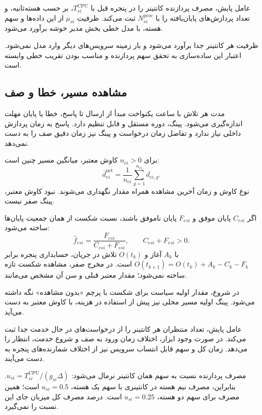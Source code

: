 عامل پایش، مصرف پردازنده کانتینر را در پنجره قبل با $T^{\mathrm{CPU}}_{si}$، بر حسب هسته‌ثانیه، و تعداد پردازش‌های پایان‌یافته را با $N^{\mathrm{proc}}_{si}$ ثبت می‌کند. ظرفیت $\mu_{si}$ از این داده‌ها و سهم هسته، با مدل خطی بخش مدیر خوشه برآورد می‌شود.

ظرفیت هر کانتینر جدا برآورد می‌شود و بار زمینه سرویس‌های دیگر وارد مدل نمی‌شود. اعتبار این ساده‌سازی به تحقق سهم پردازنده و مناسب بودن تقریب خطی وابسته است.

\subsection{مشاهده مسیر، خطا و صف}

مدت هر تلاش با ساعت یکنواخت مبدأ از ارسال تا پاسخ، خطا یا پایان مهلت اندازه‌گیری می‌شود. پینگ، دوره مستقل و قابل تنظیم دارد. پاسخ  به زمان پردازش داخلی نیاز ندارد و تفاضل زمان درخواست و پینگ نیز زمان دقیق صف را به دست نمی‌دهد.

برای $n_{ei}>0$ کاوش معتبر، میانگین مسیر چنین است:
\begin{equation}
 \overline d^{\mathrm{net}}_{ei}=\frac{1}{n_{ei}}\sum_{g=1}^{n_{ei}}d_{ei,g}.
 \label{eq:ping-mean}
\end{equation}
نوع کاوش و زمان آخرین مشاهده همراه مقدار نگهداری می‌شوند. نبود کاوش معتبر، پینگ صفر نیست.

اگر $C_{esi}$ پایان موفق و $F_{esi}$ پایان ناموفق باشند، نسبت شکست از همان جمعیت پایان‌ها ساخته می‌شود:
\begin{equation}
 \widehat f_{esi}=\frac{F_{esi}}{C_{esi}+F_{esi}},\qquad C_{esi}+F_{esi}>0.
 \label{eq:failure-observation}
\end{equation}
با $A_k$ آغاز و $O(t_k)$ تلاش در جریان، حسابداری پنجره برابر $O(t_{k+1})=O(t_k)+A_k-C_k-F_k$ است. در مخرج صفر، مشاهده شکست تازه ساخته نمی‌شود؛ مقدار معتبر قبلی و سن آن مشخص می‌مانند. 

در شروع، مقدار اولیه سیاست برای شکست با پرچم «بدون مشاهده» نگه داشته می‌شود. پینگ اولیه مسیر محلی نیز پیش از استفاده در هزینه، با کاوش معتبر به دست می‌آید.

عامل پایش، تعداد منتظران هر کانتینر را از درخواست‌های در حال خدمت جدا ثبت می‌کند. در صورت وجود ابزار، اختلاف زمان ورود به صف و شروع خدمت، انتظار را می‌دهد. زمان  کل و سهم قابل انتساب سرویس نیز از اختلاف شمارنده‌های پنجره به دست می‌آیند.

مصرف پردازنده نسبت به سهم همان کانتینر نرمال می‌شود: $u_{si}=T^{\mathrm{CPU}}_{si}/(g_{si}\Delta)$. بنابراین، مصرف نیم هسته در کانتینری با سهم یک هسته، $u_{si}=0.5$ است؛ همین مصرف برای سهم دو هسته، $u_{si}=0.25$ است. درصد مصرف کل میزبان جای این نسبت را نمی‌گیرد.

